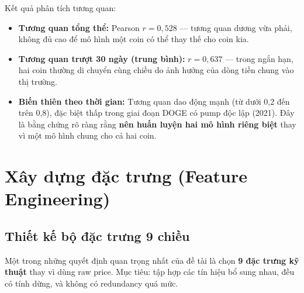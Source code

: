 \documentclass[12pt, a4paper]{report}
\begin{document}
Kết quả phân tích tương quan:
\begin{itemize}
  \item \textbf{Tương quan tổng thể:} Pearson $r = 0{,}528$ --- tương quan dương vừa phải,
    không đủ cao để mô hình một coin có thể thay thế cho coin kia.
  \item \textbf{Tương quan trượt 30 ngày (trung bình):} $r = 0{,}637$ --- trong ngắn hạn,
    hai coin thường di chuyển cùng chiều do ảnh hưởng của dòng tiền chung vào thị trường.
  \item \textbf{Biến thiên theo thời gian:} Tương quan dao động mạnh (từ dưới 0,2 đến
    trên 0,8), đặc biệt thấp trong giai đoạn DOGE có pump độc lập (2021). Đây là bằng
    chứng rõ ràng rằng \textbf{nên huấn luyện hai mô hình riêng biệt} thay vì một mô
    hình chung cho cả hai coin.
\end{itemize}

\section{Xây dựng đặc trưng (Feature Engineering)}

\subsection{Thiết kế bộ đặc trưng 9 chiều}

Một trong những quyết định quan trọng nhất của đề tài là chọn \textbf{9 đặc trưng kỹ thuật}
thay vì dùng raw price. Mục tiêu: tập hợp các tín hiệu bổ sung nhau, đều có tính dừng,
và không có redundancy quá mức.
\end{document}
